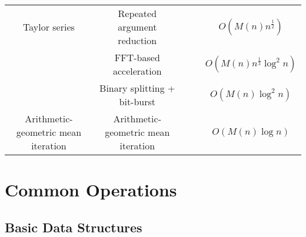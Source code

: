 \documentclass{article}
\begin{document}
\begin{table}[ht]
\begin{tabular}{c cccc}
		\hline
		Taylor series& Repeated argument reduction\footnotemark[8] \footnotemark[9]&  &  & $O(M(n)n^{\frac{1}{2}})$ \\
		& FFT-based acceleration \footnotemark[8] \footnotemark[9]&  &  & $O(M(n)n^{\frac{1}{3}}\log^2{n})$ \\
		& Binary splitting + bit-burst\footnotemark[8] \footnotemark[9]&  &  & $O(M(n)\log^2{n})$ \\
		\hline
		Arithmetic-geometric mean iteration& Arithmetic-geometric mean iteration\footnotemark[8] \footnotemark[9]&  &  & $O(M(n)\log{n})$ \\
		\hline
	\end{tabular}
\end{table}


\newpage
\section*{Common Operations}
\subsection*{Basic Data Structures}
\end{document}

